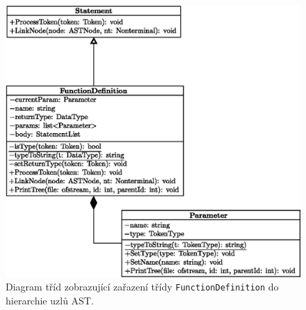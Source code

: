 \begin{figure}[h!]
	\centering
	\includegraphics[width=\textwidth]{obrazky-figures/funcdef_hierarchy.eps}
	\caption{Diagram tříd zobrazující zařazení třídy \texttt{FunctionDefinition} do hierarchie uzlů AST.}
	\label{fig_hierarchie_funcdef}	
\end{figure}



%
